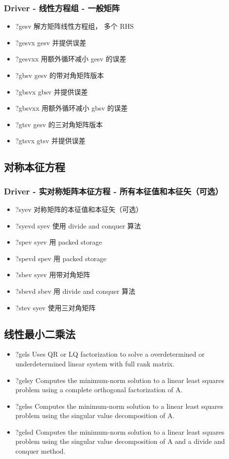 \subsubsection{Driver - 线性方程组 - 一般矩阵}
\begin{itemize}
\item ?gesv 解方矩阵线性方程组， 多个 RHS
\item ?gesvx gesv 并提供误差
\item ?gesvxx 用额外循环减小 gesv 的误差
\item ?gbsv gesv 的带对角矩阵版本
\item ?gbsvx gbsv 并提供误差
\item ?gbsvxx 用额外循环减小 gbsv 的误差
\item ?gtsv gesv 的三对角矩阵版本
\item ?gtsvx gtsv 并提供误差
\end{itemize}


\subsection{对称本征方程}
\subsubsection{Driver - 实对称矩阵本征方程 - 所有本征值和本征矢（可选）}
\begin{itemize}
\item ?syev 对称矩阵的本征值和本征矢（可选）
\item ?syevd syev 使用 divide and conquer 算法
\item ?spev syev 用 packed storage
\item ?spevd spev 用 packed storage
\item ?sbev syev 用带对角矩阵
\item ?sbevd sbev 用 divide and conquer 算法
\item ?stev syev 使用三对角矩阵
\end{itemize}

\subsection{线性最小二乘法}
\begin{itemize}
\item ?gels Uses QR or LQ factorization to solve a overdetermined or underdetermined linear system with full rank matrix.
\item ?gelsy Computes the minimum-norm solution to a linear least squares problem using a complete orthogonal factorization of A.
\item ?gelss Computes the minimum-norm solution to a linear least squares problem using the singular value decomposition of A.
\item ?gelsd Computes the minimum-norm solution to a linear least squares problem using the singular value decomposition of A and a divide and conquer method.
\end{itemize}
